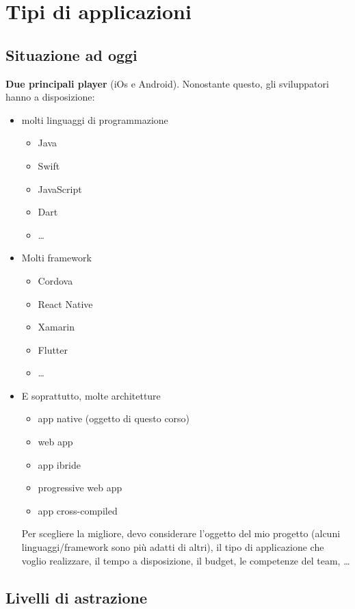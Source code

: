 
\chapter{Tipi di applicazioni}
\section{Situazione ad oggi}
\par \textbf{Due principali player} (iOs e Android). Nonostante questo, gli sviluppatori hanno a disposizione:
\begin{itemize}
    \item molti linguaggi di programmazione
    \begin{itemize}
        \item Java
        \item Swift
        \item JavaScript
        \item Dart
        \item \dots
    \end{itemize}
    \item Molti framework
    \begin{itemize}
        \item Cordova
        \item React Native
        \item Xamarin
        \item Flutter
        \item \dots
    \end{itemize}
    \item E soprattutto, molte architetture
    \begin{itemize}
        \item app native (oggetto di questo corso)
        \item web app
        \item app ibride
        \item progressive web app
        \item app cross-compiled
    \end{itemize}
    Per scegliere la migliore, devo considerare l'oggetto del mio progetto (alcuni linguaggi/framework sono più adatti di altri), il tipo di applicazione che voglio realizzare, il tempo a disposizione, il budget, le competenze del team, \dots
\end{itemize}

\section{Livelli di astrazione}
